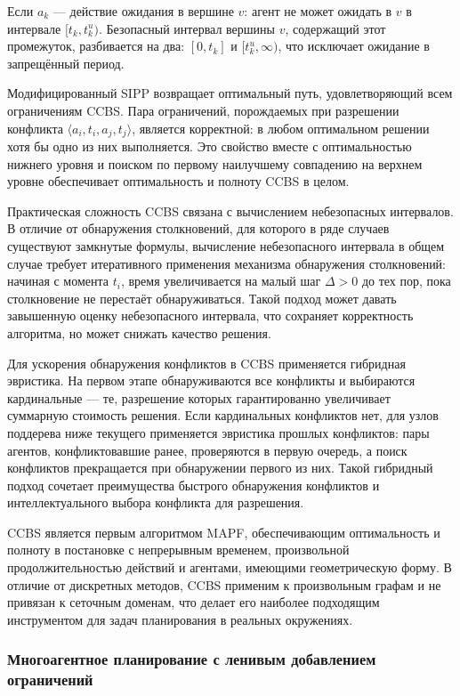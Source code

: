 Если $a_k$ --- действие ожидания в вершине $v$: агент не может ожидать в $v$ в интервале
$[t_k, t_k^u)$. Безопасный интервал вершины $v$, содержащий этот промежуток, разбивается на два:
$[0, t_k]$ и $[t_k^u, \infty)$, что исключает ожидание в запрещённый период.

Модифицированный SIPP возвращает оптимальный путь, удовлетворяющий всем ограничениям CCBS.
Пара ограничений, порождаемых при разрешении конфликта $\langle a_i, t_i, a_j, t_j \rangle$, является
корректной: в любом оптимальном решении хотя бы одно из них выполняется. Это свойство вместе с
оптимальностью нижнего уровня и поиском по первому наилучшему совпадению на верхнем уровне
обеспечивает оптимальность и полноту CCBS в целом.

Практическая сложность CCBS связана с вычислением небезопасных интервалов. В отличие от обнаружения
столкновений, для которого в ряде случаев существуют замкнутые формулы, вычисление небезопасного
интервала в общем случае требует итеративного применения механизма обнаружения столкновений:
начиная с момента $t_i$, время увеличивается на малый шаг $\Delta > 0$ до тех пор, пока
столкновение не перестаёт обнаруживаться. Такой подход может давать завышенную оценку небезопасного
интервала, что сохраняет корректность алгоритма, но может снижать качество решения.

Для ускорения обнаружения конфликтов в CCBS применяется гибридная эвристика. На первом этапе
обнаруживаются все конфликты и выбираются кардинальные --- те, разрешение которых гарантированно
увеличивает суммарную стоимость решения. Если кардинальных конфликтов нет, для узлов поддерева
ниже текущего применяется эвристика прошлых конфликтов: пары агентов, конфликтовавшие ранее,
проверяются в первую очередь, а поиск конфликтов прекращается при обнаружении первого из них.
Такой гибридный подход сочетает преимущества быстрого обнаружения конфликтов и интеллектуального
выбора конфликта для разрешения.

CCBS является первым алгоритмом MAPF, обеспечивающим оптимальность и полноту в постановке с 
непрерывным временем, произвольной продолжительностью действий и агентами, имеющими геометрическую 
форму. В отличие от дискретных методов, CCBS применим к произвольным графам и не 
привязан к сеточным доменам, что делает его наиболее подходящим инструментом для задач планирования 
в реальных окружениях.

\subsubsection{Многоагентное планирование с ленивым добавлением ограничений}

